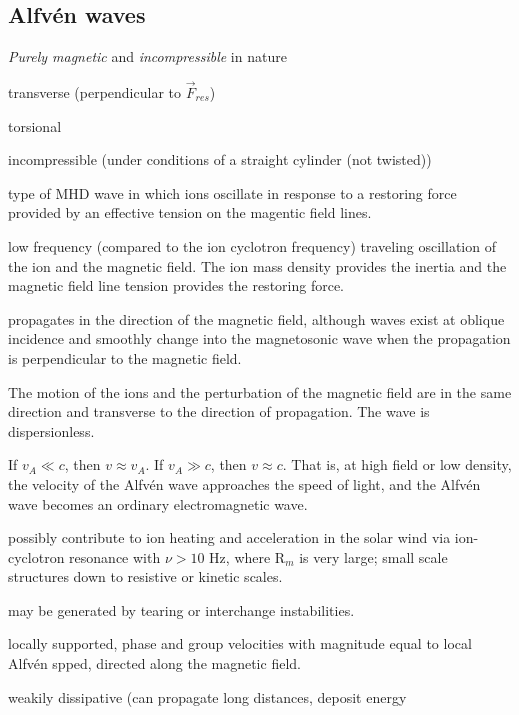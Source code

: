 \documentclass[12pt]{article}
\begin{document}
\subsection*{Alfv\'en waves}
\begin{itemize*}
    \item \emph{Purely magnetic} and \emph{incompressible} in nature
    \item transverse (perpendicular to $\vec{F}_{res}$)
    \item torsional
    \item incompressible (under conditions of a straight cylinder (not twisted))
    \item type of MHD wave in which ions oscillate in response to a restoring
        force provided by an effective tension on the magentic field lines.
    \item low frequency (compared to the ion cyclotron frequency) traveling
        oscillation of the ion and the magnetic field. The ion mass
        density provides the inertia and the magnetic field line
        tension provides the restoring force.
    \item propagates in the direction of the magnetic field, although waves exist
        at oblique incidence and smoothly change into the magnetosonic wave
        when the propagation is perpendicular to the magnetic field.
    \item The motion of the ions and the perturbation of the magnetic
        field are in the same direction and transverse to the direction of
        propagation. The wave is dispersionless.
    \item If $v_{A} \ll c$, then $v \approx v_{A}$. If $v_{A} \gg c$,
        then $v \approx c$. That is, at high field or low density, the
        velocity of the Alfv\'en wave approaches the speed of light,
        and the Alfv\'en wave becomes an ordinary electromagnetic
        wave.
    \item possibly contribute to ion heating and acceleration in the solar
        wind via ion-cyclotron resonance with $ \nu > 10$ Hz, where R$_m$ is
        very large; small scale structures down to resistive or kinetic scales.
    \item may be generated by tearing or interchange instabilities.
    \item locally supported, phase and group velocities with magnitude equal to
        local Alfv\'en spped, directed along the magnetic field.
    \item weakily dissipative (can propagate long distances, deposit energy

\end{itemize*}
\end{document}

